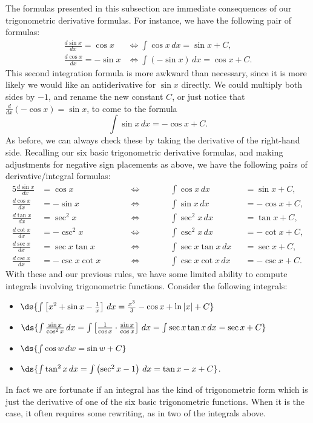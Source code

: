 The formulas presented in this subsection are immediate
consequences of our trigonometric derivative formulas.
For instance, we have the following pair of formulas:
\begin{align*}
\frac{d\sin x}{dx}=\cos x&\iff \int\cos x\,dx=\sin x+C,\\
\frac{d\cos x}{dx}=-\sin x&\iff \int(-\sin x)\,dx=\cos x+C.\end{align*}
This second integration formula is more awkward than necessary,
since it is more likely we would like an antiderivative for 
$\sin x$ directly.  We could multiply both sides by $-1$, and
rename the new constant $C$, or just notice that
$\frac{d}{dx}(-\cos x)=\sin x$, to come to the formula
$$\int \sin x\,dx=-\cos x+C.$$
As before, we can always check these by taking the derivative
of the right-hand side.  Recalling our six basic trigonometric
derivative formulas, and making adjustments for negative sign
placements as above, we have the following pairs of 
derivative/integral formulas:
\begin{alignat}{5}
\frac{d\sin x}{dx}&=\cos x&\qquad&\iff\qquad&&\int\cos x\,dx&&=\sin x+C,
      \label{IntOfCosine}\\
\frac{d\cos x}{dx}&=-\sin x&&\iff&&\int\sin x\,dx&&=-\cos x+C,
      \label{IntOfSine}\\
\frac{d\tan x}{dx}&=\sec^2x&&\iff&&\int\sec^2x\,dx&&=\tan x+C,
      \label{IntOfSecSquared}\\
\frac{d\cot x}{dx}&=-\csc^2x&&\iff&&\int\csc^2x\,dx&&=-\cot x+C,
      \label{IntOfCscSquared}\\
\frac{d\sec x}{dx}&=\sec x\tan x&&\iff&&\int\sec x\tan x\,dx&&=\sec x+C,
      \label{IntOfSecTan}\\
\frac{d\csc x}{dx}&=-\csc x\cot x&&\iff&&\int\csc x\cot x\,dx
                                    &&=-\csc x+C.
      \label{IntOfCscCot}
\end{alignat}
With these and our previous rules, we have some limited
ability to compute integrals involving trigonometric functions.
\bex Consider the following integrals:
\begin{itemize}
\item $\ds{\int\left[x^2+\sin x-\frac1x\right]\,dx=\frac{x^3}3-\cos x+\ln|x|+C
            }$
\item $\ds{\int\frac{\sin x}{\cos^2x}\,dx
      =\int\left[\frac1{\cos x}\cdot\frac{\sin x}{\cos x}\right]\,dx
      =\int\sec x\tan x\,dx=\sec x+C}$
\item $\ds{\int\cos w\,dw=\sin w+C}$
\item $\ds{\int\tan^2x\,dx=\int\left(\sec^2x-1\right)\,dx=\tan x-x+C}$.
\end{itemize}
\eex
In fact we are fortunate if an integral has the kind of trigonometric
form which is just the derivative of one of the six basic trigonometric
functions.  When it is the case, it often requires some rewriting,
as in two of the integrals above.
